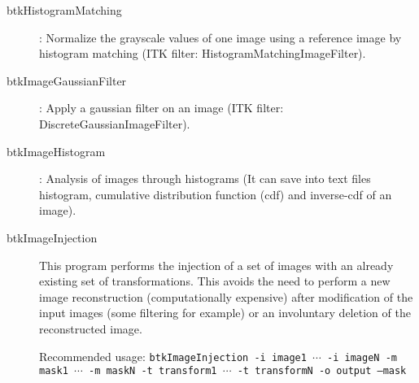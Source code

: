 \begin{description}
\item[btkHistogramMatching]: Normalize the grayscale values of one image using a reference image by histogram matching (ITK filter: HistogramMatchingImageFilter).
\item[btkImageGaussianFilter]: Apply a gaussian filter on an image (ITK filter: DiscreteGaussianImageFilter).
\item[btkImageHistogram]: Analysis of images through histograms (It can save into text files histogram, cumulative distribution function (cdf) and inverse-cdf of an image).
\item[btkImageInjection] This program performs the injection of a set
of images with an already existing set of transformations. This avoids the need
to perform a new image reconstruction (computationally expensive) after
modification of the input images (some filtering for example) or an involuntary
deletion of the reconstructed image.

Recommended usage: \texttt{btkImageInjection -i image1 $\cdots$ -i
imageN -m mask1 $\cdots$ -m maskN -t transform1 $\cdots$ -t
transformN -o output --mask}


\end{description}
